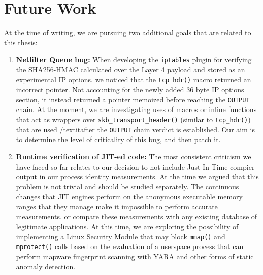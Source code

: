 \section{Future Work}
\label{conclusion:future}

At the time of writing, we are pursuing two additional goals that are related
to this thesis:

\begin{enumerate}
    \item \textbf{Netfilter Queue bug:} When developing the \texttt{iptables}
    plugin for verifying the SHA256-HMAC calculated over the Layer 4 payload
    and stored as an experimental IP options, we noticed that the \texttt{tcp_hdr()}
    macro returned an incorrect pointer. Not accounting for the newly added 36
    byte IP options section, it instead returned a pointer memoized before
    reaching the \texttt{OUTPUT} chain. At the moment, we are investigating
    uses of macros or inline functions that act as wrappers over
    \texttt{skb_transport_header()} (similar to \texttt{tcp_hdr()}) that are
    used /textit{after} the \texttt{OUTPUT} chain verdict is established. Our
    aim is to determine the level of criticality of this bug, and then patch it.

    \item \textbf{Runtime verification of JIT-ed code:} The most consistent
    criticism we have faced so far relates to our decision to not include
    Just In Time compier output in our process identity measurements. At the time
    we argued that this problem is not trivial and should be studied separately.
    The continuous changes that JIT engines perform on the anonymous executable
    memory ranges that they manage make it impossible to perform accurate
    measurements, or compare these measurements with any existing database of
    legitimate applications. At this time, we are exploring the possibility of
    implementing a Linux Security Module that may block \texttt{mmap()} and
    \texttt{mprotect()} calls based on the evaluation of a userspace process
    that can perform mapware fingerprint scanning with YARA \cite{naik2020embedding}
    and other forms of static anomaly detection.
\end{enumerate}
